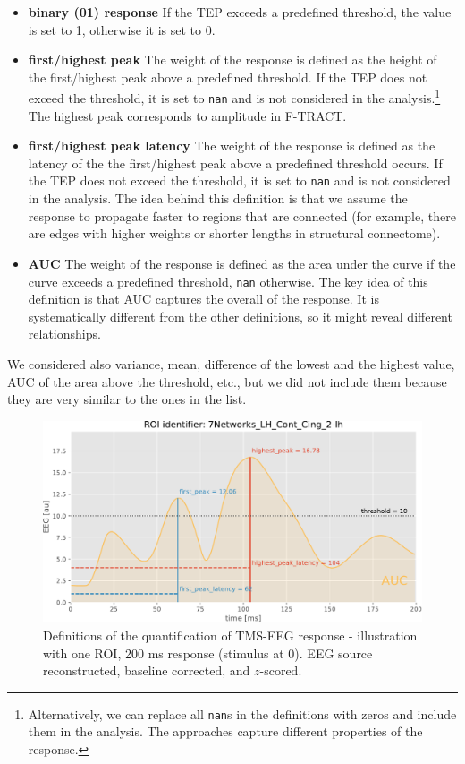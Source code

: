 \begin{itemize}
    \item \textbf{binary (01) response} If the TEP exceeds a predefined threshold, the value is set to 1, otherwise it is set to 0.
    \item \textbf{first/highest peak} The weight of the response is defined as the height of the first/highest peak above a predefined threshold. If the TEP does not exceed the threshold, it is set to \texttt{nan} and is not considered in the analysis.\footnote{Alternatively, we can replace all \texttt{nan}s in the definitions with zeros and include them in the analysis. The approaches capture different properties of the response.} The highest peak corresponds to amplitude in F-TRACT. 
    \item \textbf{first/highest peak latency} The weight of the response is defined as the latency of the the first/highest peak above a predefined threshold occurs. If the TEP does not exceed the threshold, it is set to \texttt{nan} and is not considered in the analysis. The idea behind this definition is that we assume the response to propagate faster to regions that are  connected (for example, there are edges with higher weights or shorter lengths in structural connectome).
    \item \textbf{AUC} The weight of the response is defined as the area under the curve if the curve exceeds a predefined threshold, \texttt{nan} otherwise. The key idea of this definition is that AUC captures the overall  of the response. It is systematically different from the other definitions, so it might reveal different relationships.
\end{itemize}

We considered also variance, mean, difference of the lowest and the highest value, AUC of the area above the threshold, etc., but we did not include them because they are very similar to the ones in the list.

\begin{figure}
    \centering
    \includegraphics[width=\textwidth]{images/nootebook_generated/tmseeg_results/simulated/200/not_over_threshold_nan/7Networks_LH_Cont_Cing_2-lh_response_def.pdf}
    \caption[TMS-EEG response definitions -- illustration]{Definitions of the quantification of TMS-EEG response - illustration with one ROI, 200 ms response (stimulus at 0). EEG source reconstructed, baseline corrected, and $z$-scored.}
    \label{fig:tms-respondse-definition}
\end{figure}

